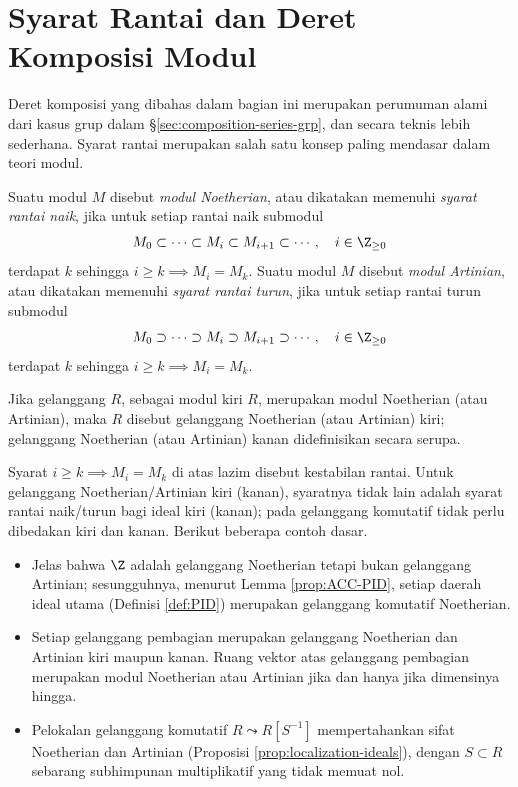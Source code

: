 \section{Syarat Rantai dan Deret Komposisi Modul}
Deret komposisi yang dibahas dalam bagian ini merupakan perumuman alami dari kasus grup dalam \S\ref{sec:composition-series-grp}, dan secara teknis lebih sederhana. Syarat rantai merupakan salah satu konsep paling mendasar dalam teori modul.

\begin{definition}\label{def:ACC-DCC-mod}
	Suatu modul $M$ disebut \emph{modul Noetherian}, atau dikatakan memenuhi \emph{syarat rantai naik}, jika untuk setiap rantai naik submodul
	$$ M_0 \subset \cdots \subset M_i \subset M_{i+1} \subset \cdots, \quad i \in \Z_{\geq 0} $$
	terdapat $k$ sehingga $i \geq k \implies M_i = M_k$. Suatu modul $M$ disebut \emph{modul Artinian}, atau dikatakan memenuhi \emph{syarat rantai turun}, jika untuk setiap rantai turun submodul
	$$ M_0 \supset \cdots \supset M_i \supset M_{i+1} \supset \cdots, \quad i \in \Z_{\geq 0} $$
	terdapat $k$ sehingga $i \geq k \implies M_i = M_k$.
	
	Jika gelanggang $R$, sebagai modul kiri $R$, merupakan modul Noetherian (atau Artinian), maka $R$ disebut gelanggang Noetherian (atau Artinian) kiri; gelanggang Noetherian (atau Artinian) kanan didefinisikan secara serupa.
\end{definition}
Syarat $i \geq k \implies M_i = M_k$ di atas lazim disebut kestabilan rantai. Untuk gelanggang Noetherian/Artinian kiri (kanan), syaratnya tidak lain adalah syarat rantai naik/turun bagi ideal kiri (kanan); pada gelanggang komutatif tidak perlu dibedakan kiri dan kanan. Berikut beberapa contoh dasar.
\begin{itemize}
	\item Jelas bahwa $\Z$ adalah gelanggang Noetherian tetapi bukan gelanggang Artinian; sesungguhnya, menurut Lemma \ref{prop:ACC-PID}, setiap daerah ideal utama (Definisi \ref{def:PID}) merupakan gelanggang komutatif Noetherian.
	\item Setiap gelanggang pembagian merupakan gelanggang Noetherian dan Artinian kiri maupun kanan. Ruang vektor atas gelanggang pembagian merupakan modul Noetherian atau Artinian jika dan hanya jika dimensinya hingga.
	\item Pelokalan gelanggang komutatif $R \leadsto R[S^{-1}]$ mempertahankan sifat Noetherian dan Artinian (Proposisi \ref{prop:localization-ideals}), dengan $S \subset R$ sebarang subhimpunan multiplikatif yang tidak memuat nol.
\end{itemize}

